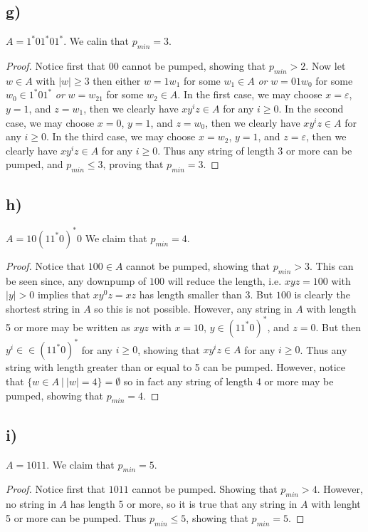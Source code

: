 \documentclass[a4paper,11pt]{article}
\newcommand{\abs}[1]{\left\lvert #1 \right\rvert}
\numberwithin{equation}{section}
\begin{document}
\subsection*{g)}
$A=1^\ast01^\ast01^\ast$. We calin that $p_{min}=3$.
\begin{proof}
Notice first that $00$ cannot be pumped, showing that $p_{min}>2$. Now let $w\in A$ with $\abs{w}\geq3$ then either $w=1w_1$ for some $w_1\in A$ \emph{or} $w=01w_0$ for some $w_0\in1^\ast01^\ast$ \emph{or} $w=w_21$ for some $w_2\in A$. In the first case, we may choose $x=\varepsilon$, $y=1$, and $z=w_1$, then we clearly have $xy^iz\in A$ for any $i\geq0$. In the second case, we may choose $x=0$, $y=1$, and $z=w_0$, then we clearly have $xy^iz\in A$ for any $i\geq0$. In the third case, we may choose $x=w_2$, $y=1$, and $z=\varepsilon$, then we clearly have $xy^iz\in A$ for any $i\geq0$. Thus any string of length $3$ or more can be pumped, and $p_{min}\leq 3$, proving that $p_{min}=3$.
\end{proof}
\subsection*{h)}
$A=10(11^\ast0)^\ast0$
We claim that $p_{min}=4$.
\begin{proof}
Notice that $100\in A$ cannot be pumped, showing that $p_{min}>3$. This can be seen since, any downpump of $100$ will reduce the length, i.e. $xyz=100$ with $\abs{y}>0$ implies that $xy^0z=xz$ has length smaller than 3. But $100$ is clearly the shortest string in $A$ so this is not possible. However, any string in $A$ with length 5 or more may be written as $xyz$ with $x=10$, $y\in(11^\ast0)^\ast$, and $z=0$. But then $y^i\in \in(11^\ast0)^\ast$ for any $i\geq0$, showing that $xy^iz\in A$ for any $i\geq0$. Thus any string with length greater than or equal to 5 can be pumped. However, notice that $\{w\in A\ \vert\ \abs{w}=4\}=\emptyset$ so in fact any string of length 4 or more may be pumped, showing that $p_{min}=4$.
\end{proof}
\subsection*{i)}
$A=1011$. We claim that $p_{min}=5$.
\begin{proof}
Notice first that $1011$ cannot be pumped. Showing that $p_{min}>4$. However, no string in $A$ has length 5 or more, so it is true that any string in $A$ with lenght 5 or more can be pumped. Thus $p_{min}\leq5$, showing that $p_{min}=5$.
\end{proof}
\end{document}
